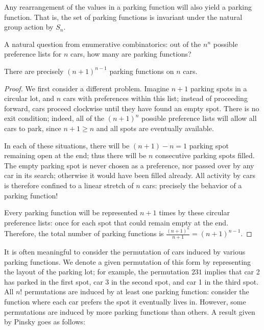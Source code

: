 \begin{corollary}
    Any rearrangement of the values in a parking function will also yield a parking function. That is, the set of parking functions is invariant under the natural group action by $S_n.$
\end{corollary}

A natural question from enumerative combinatorics: out of the $n^n$ possible preference lists for $n$ cars, how many are parking functions?

\begin{proposition}
    There are precisely $(n+1)^{n-1}$ parking functions on $n$ cars.
\end{proposition}

\begin{proof}
    We first consider a different problem. Imagine $n+1$ parking spots in a circular lot, and $n$ cars with preferences within this list; instead of proceeding forward, cars proceed clockwise until they have found an empty spot. There is no exit condition; indeed, all of the $(n+1)^n$ possible preference lists will allow all cars to park, since $n+1\ge n$ and all spots are eventually available.
    
    In each of these situations, there will be $(n+1)-n=1$ parking spot remaining open at the end; thus there will be $n$ consecutive parking spots filled. The empty parking spot is never chosen as a preference, nor passed over by any car in its search; otherwise it would have been filled already. All activity by cars is therefore confined to a linear stretch of $n$ cars: precisely the behavior of a parking function!

    Every parking function will be represented $n+1$ times by these circular preference lists: once for each spot that could remain empty at the end. Therefore, the total number of parking functions is $\frac{(n+1)^n}{n+1}=(n+1)^{n-1}.$
\end{proof}

It is often meaningful to consider the permutation of cars induced by various parking functions. We denote a given permutation of this form by representing the layout of the parking lot; for example, the permutation $231$ implies that car 2 has parked in the first spot, car 3 in the second spot, and car 1 in the third spot. \\

All $n!$ permutations are induced by at least one parking function: consider the function where each car prefers the spot it eventually lives in. However, some permutations are induced by more parking functions than others. A result given by Pinsky \cite{pinsky2024distribution} goes as follows:

